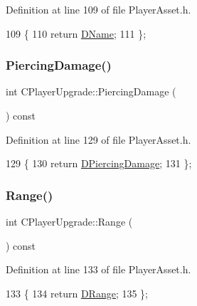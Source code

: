 Definition at line 109 of file Player\+Asset.\+h.


\begin{DoxyCode}
109                               \{
110             \textcolor{keywordflow}{return} \hyperlink{classCPlayerUpgrade_a1ea2a137ee148c976ee6daef129a6e11}{DName};  
111         \};
\end{DoxyCode}
\hypertarget{classCPlayerUpgrade_a80192c973e69a2bd3645c91ca103a40e}{}\label{classCPlayerUpgrade_a80192c973e69a2bd3645c91ca103a40e} 
\subsubsection{\texorpdfstring{Piercing\+Damage()}{PiercingDamage()}}
{\footnotesize\ttfamily int C\+Player\+Upgrade\+::\+Piercing\+Damage (\begin{DoxyParamCaption}{ }\end{DoxyParamCaption}) const\hspace{0.3cm}{\ttfamily [inline]}}



Definition at line 129 of file Player\+Asset.\+h.


\begin{DoxyCode}
129                                   \{
130             \textcolor{keywordflow}{return} \hyperlink{classCPlayerUpgrade_a295d68f988ae198c66d96793824ca332}{DPiercingDamage};  
131         \};
\end{DoxyCode}
\hypertarget{classCPlayerUpgrade_a4f2a0375a5a712e629e00da86727588c}{}\label{classCPlayerUpgrade_a4f2a0375a5a712e629e00da86727588c} 
\subsubsection{\texorpdfstring{Range()}{Range()}}
{\footnotesize\ttfamily int C\+Player\+Upgrade\+::\+Range (\begin{DoxyParamCaption}{ }\end{DoxyParamCaption}) const\hspace{0.3cm}{\ttfamily [inline]}}



Definition at line 133 of file Player\+Asset.\+h.


\begin{DoxyCode}
133                          \{
134             \textcolor{keywordflow}{return} \hyperlink{classCPlayerUpgrade_a88aff53c9fb5d3bddfd69d1aced8dbaf}{DRange};  
135         \};
\end{DoxyCode}
\hypertarget{classCPlayerUpgrade_aa5d709df37ad2478336da2c77065cf73}{}\label{classCPlayerUpgrade_aa5d709df37ad2478336da2c77065cf73} 
